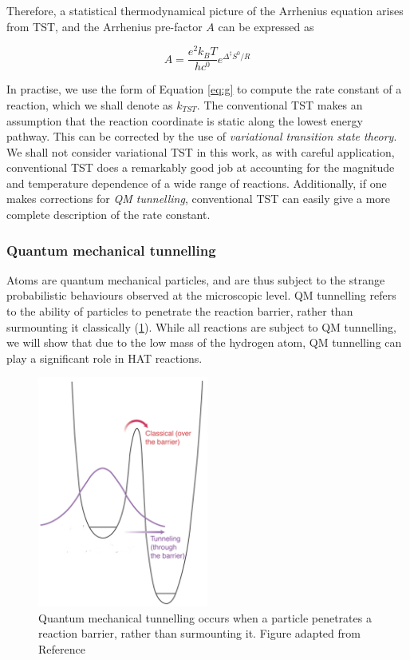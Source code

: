 Therefore, a statistical thermodynamical picture of the Arrhenius equation arises from TST, and the Arrhenius pre-factor $A$ can be expressed as

\begin{equation}
  A = \frac{e^2k_BT}{hc^0}e^{\Delta^\ddagger S^0/R}
\end{equation}

In practise, we use the form of Equation \ref{eq:g} to compute the rate constant of a reaction, which we shall denote as $k_{TST}$. The conventional TST makes an assumption that the reaction coordinate is static along the lowest energy pathway. This can be corrected by the use of \emph{variational transition state theory}.\cite{Truhlar1984} We shall not consider variational TST in this work, as with careful application, conventional TST does a remarkably good job at accounting for the magnitude and temperature dependence of a wide range of reactions.\cite{Steinfeld1998} Additionally, if one makes corrections for \emph{QM tunnelling}, conventional TST can easily give a more complete description of the rate constant.

\subsubsection{Quantum mechanical tunnelling}

Atoms are quantum mechanical particles, and are thus subject to the strange probabilistic behaviours observed at the microscopic level. QM tunnelling refers to the ability of particles to penetrate the reaction barrier, rather than surmounting it classically (\ref{fig:tunnelling}). While all reactions are subject to QM tunnelling, we will show that due to the low mass of the hydrogen atom, QM tunnelling can play a significant role in HAT reactions.

\begin{figure}[htb]
  \centering
  \includegraphics[width=0.5\textwidth]{figures/tunnelling-1}
  \caption{Quantum mechanical tunnelling occurs when a particle penetrates a
    reaction barrier, rather than surmounting it. Figure adapted from Reference {\protect{}}}
  \label{fig:tunnelling}
\end{figure}


